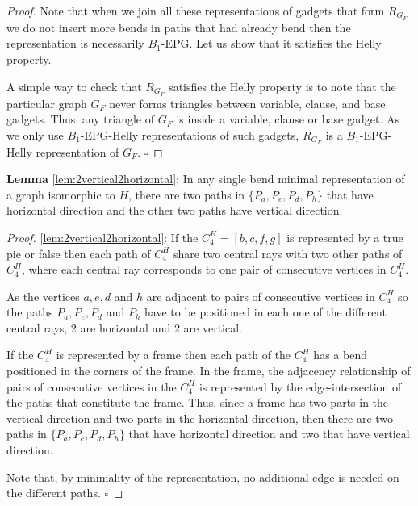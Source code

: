 \documentclass[runningheads]{llncs}
\begin{document}
\begin{proof}






Note that when we join all these representations of gadgets that form $ R_{G_F} $ we do not insert more bends in paths that had already bend then the representation is necessarily  $ B_1$-EPG. Let us show that it satisfies the Helly property. 

A simple way to check that $ R_{G_F} $ satisfies the Helly property  is to note that the particular graph $G_F$ never forms triangles between variable, clause, and base gadgets. Thus, any triangle of $G_F$ is inside a variable, clause or base gadget. As we only use $B_1$-EPG-Helly representations of such gadgets, $ R_{G_F} $ is a $B_1$-EPG-Helly representation of $G_F$.
$\square$ \end{proof}

\begin{lemma*}\textbf{Lemma} \ref{lem:2vertical2horizontal}:
In any single bend minimal representation of a graph isomorphic to $H$, there are two paths in $\{P_{a}, P_{e}, P_{d}, P_{h} \}$ that have horizontal direction and the other two paths have vertical direction.
\end{lemma*}

\begin{proof}%
\ref{lem:2vertical2horizontal}:
If the $C_4^{H} = [b,c,f,g]$ is  represented by a true pie or false then each path of $C_4^{H}$ share two central rays with two other paths of $C_4^{H}$, where each central ray corresponds to one pair of consecutive vertices in $C_4^{H}$.

As the vertices $a, e, d $ and $ h$ are adjacent to pairs of consecutive vertices in $C_4^{H}$ so the paths $P_{a}, P_{e}, P_{d}$ and $P_{h}$ have to be positioned in each one of the different central rays,  2 are horizontal  and 2 are vertical.

If the $C_4^{H}$ is  represented by a frame then each path of the $C_4^{H}$ has a bend positioned in  the corners of the frame. In the frame, the adjacency relationship of pairs of consecutive vertices in the $C_4^{H}$ is represented by the edge-intersection of the paths that constitute the frame. Thus, since a frame has two parts in the vertical direction and two parts in the horizontal direction, then there are two paths in $\{P_{a}, P_{e}, P_{d}, P_{h}\}$ that have horizontal direction and two that have vertical direction.

Note that, by minimality of the representation, no additional edge is needed on the different paths.
$\square$ \end{proof}
\end{document}
